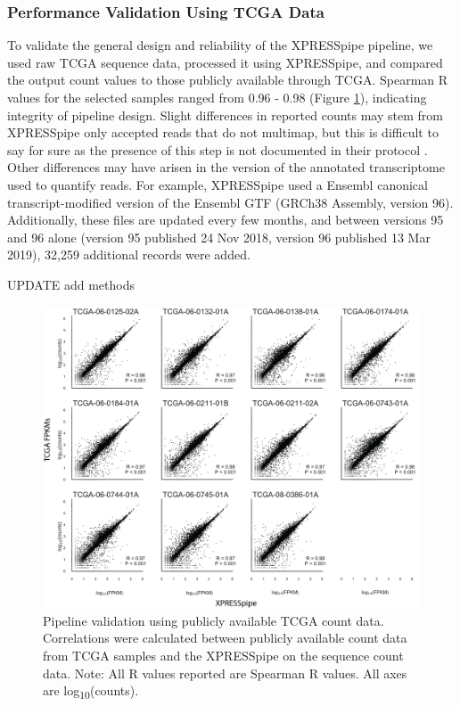\documentclass[11pt, a4paper, oneside]{article}
\begin{document}
\subsubsection{Performance Validation Using TCGA Data}
To validate the general design and reliability of the XPRESSpipe pipeline, we used raw TCGA sequence data, processed it using XPRESSpipe, and compared the output count values to those publicly available through TCGA. Spearman R values for the selected samples ranged from 0.96 - 0.98 (Figure \ref{fig:figure4}), indicating integrity of pipeline design. Slight differences in reported counts may stem from XPRESSpipe only accepted reads that do not multimap, but this is difficult to say for sure as the presence of this step is not documented in their protocol \cite{gdc_pipeline}. Other differences may have arisen in the version of the annotated transcriptome used to quantify reads. For example, XPRESSpipe used a Ensembl canonical transcript-modified version of the Ensembl GTF (GRCh38 Assembly, version 96). Additionally, these files are updated every few months, and between versions 95 and 96 alone (version 95 published 24 Nov 2018, version 96 published 13 Mar 2019), 32,259 additional records were added.

UPDATE add methods

\begin{figure}
\centering
  \includegraphics[width=180mm]{figures/xpresspipe_figure4.png}
  \caption{Pipeline validation using publicly available TCGA count data. Correlations were calculated between publicly available count data from TCGA samples and the XPRESSpipe on the sequence count data. Note: All R values reported are Spearman R values. All axes are log\textsubscript{10}(counts).}
  \label{fig:figure4}
\end{figure}
\end{document}
